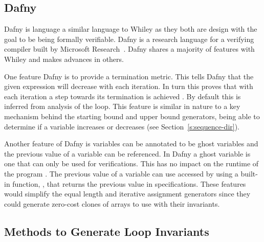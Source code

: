 

\subsection{Dafny}

Dafny is language a similar language to Whiley as they both are design with the
goal to be  being formally verifiable.
Dafny is a research language for a verifying compiler built by Microsoft
Research~\cite{dafny-lang}.
Dafny shares a majority of features with Whiley and makes advances in others.

One feature Dafny is to provide a termination metric.
This tells Dafny that the given expression will decrease with each iteration. 
In turn this proves that with each iteration a step towards its termination is achieved \cite{dafny-started}\cite{dafny-lang}.
By default this is inferred from analysis of the loop.
This feature is similar in nature to a key mechanism behind the starting bound and upper bound
generators, being able to determine if a variable increases or decreases
(see Section~\ref{s:sequence-dir}). 

Another feature of Dafny is variables can be annotated to be ghost variables
and the previous value of a variable can be referenced.
In Dafny a ghost variable is one that can only be used for verifications.
This has no impact on the runtime of the program \cite{dafny-started}\cite{dafny-lang}.
The previous value of a variable can use accessed by using a built-in
function, , that returns the previous value in specifications.
These features would simplify the equal length and iterative assignment
generators since they could generate zero-cost clones of arrays to use
with their invariants. 


\subsection{Methods to Generate Loop Invariants}

